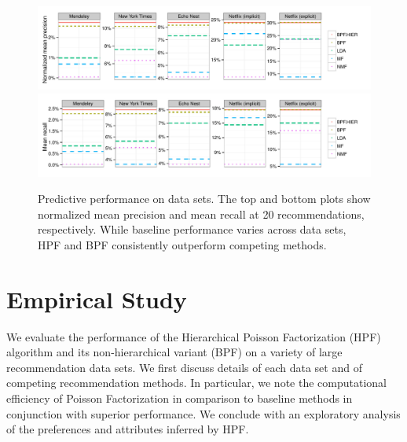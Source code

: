 
\begin{figure}[t!]
\centering
\includegraphics[width=\textwidth]{figures/mean_precision_at_20.pdf}\\
\includegraphics[width=\textwidth]{figures/mean_recall_at_20.pdf}\\
\caption{Predictive performance on data sets. The top and bottom plots
  show normalized mean precision and mean recall at 20
  recommendations, respectively. While baseline performance varies
  across data sets, HPF and BPF consistently outperform competing
  methods.}
\label{fig:precision_recall_at_10}
\end{figure}


\section{Empirical Study}
We evaluate the performance of the Hierarchical Poisson Factorization
(HPF) algorithm and its non-hierarchical variant (BPF) on a variety of
large recommendation data sets. We first discuss details of each data
set and of competing recommendation methods. In particular, we note
the computational efficiency of Poisson Factorization in comparison to
baseline methods in conjunction with superior performance. We conclude
with an exploratory analysis of the preferences and attributes
inferred by HPF.

